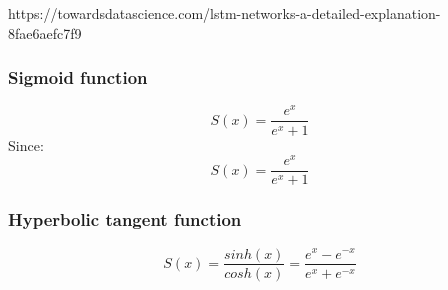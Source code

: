 https://towardsdatascience.com/lstm-networks-a-detailed-explanation-8fae6aefc7f9
\subsubsection{Sigmoid function}
\begin{equation}
    S(x) = \frac{e^x}{e^x+1}
\end{equation}
Since: 
\begin{equation}
    S(x) = \frac{e^x}{e^x+1}
\end{equation}
\subsubsection{Hyperbolic tangent function}
\begin{equation}
    S(x) = \frac{sinh(x)}{cosh(x)} = \frac{e^x-e^{-x}}{e^x+e^{-x}}
\end{equation}